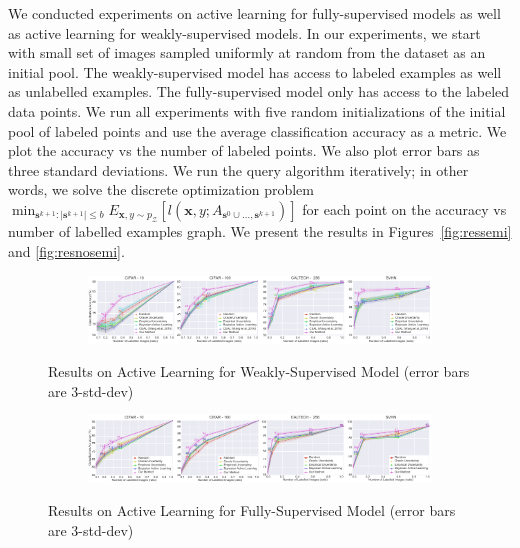\documentclass{article} %
\begin{document}
We conducted experiments on active learning for fully-supervised models as well as active learning for weakly-supervised
models. In our experiments, we start with small set of images sampled uniformly at random from the dataset as an initial
pool. The weakly-supervised model has access to labeled examples as well as unlabelled examples. The fully-supervised
model only has access to the labeled data points. We run all experiments with five random initializations of the initial
pool of labeled points and use the average classification accuracy as a metric. We plot the accuracy vs the number of
labeled points. We also plot error bars as three standard deviations. We run the query algorithm iteratively; in other
words, we solve the discrete optimization problem $\min_{\mathbf{s}^{k+1} : |\mathbf{s}^{k+1}| \leq b} E_{\mathbf{x},y
\sim p_\mathcal{Z}} [l(\mathbf{x},y; A_{\mathbf{s}^{0} \cup \ldots, \mathbf{s}^{k+1}})]$ for each point on the accuracy
vs number of labelled examples graph. We present the results in Figures~\ref{fig:ressemi} and \ref{fig:resnosemi}.

\begin{figure}[tb]
    \centering
    \begin{subfigure}[b]{\textwidth}
        \includegraphics[width=\textwidth]{fig_ws3.pdf}
    \end{subfigure}
    \vspace{-5mm}
    \caption{Results on Active Learning for Weakly-Supervised Model (error bars are 3-std-dev)}\label{fig:ressemi}
        \vspace{-3mm}
    \label{fig:resns}
   \vspace{5mm}
    \begin{subfigure}[b]{\textwidth}
        \includegraphics[width=\textwidth]{fs_fig3.pdf}
    \end{subfigure}
        \vspace{-5mm}
    \caption{Results on Active Learning for Fully-Supervised Model (error bars are 3-std-dev)}\label{fig:resnosemi}
        \vspace{-5mm}
    \label{fig:ress}
\end{figure}
\end{document}

